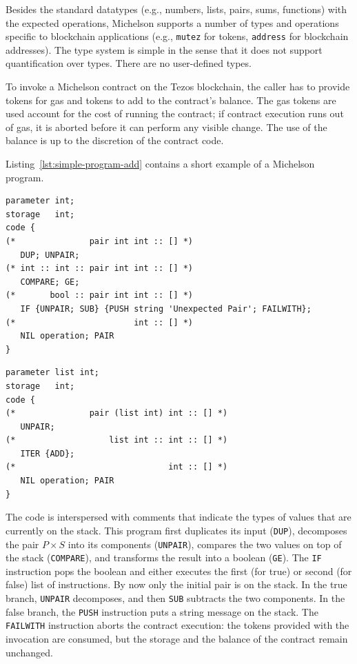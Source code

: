 \documentclass[a4paper,USenglish,cleveref, autoref,anonymous]{lipics-v2021}
\begin{document}
Besides the standard datatypes (e.g., numbers, lists, pairs, sums, functions)
with the expected operations,
Michelson supports a number of types and operations specific to blockchain applications (e.g.,
\texttt{mutez} for tokens, \texttt{address} for blockchain
addresses). The type system is simple in the sense that it does not
support quantification over types. There are no user-defined types.

To invoke a Michelson contract on the Tezos blockchain, the caller has
to provide tokens for gas and tokens to add to the contract's balance.
The gas tokens are used account for the cost of running the contract;
if contract execution runs out of gas, it is aborted before it can
perform any visible change. The use of the balance is up to the
discretion of the contract code.

Listing~\ref {lst:simple-program-add} contains a short example of a Michelson program.
\begin{lstlisting}[float=tp,captionpos=b,caption={A Michelson program},label={lst:simple-program-add}]
parameter int;
storage   int;
code { 
(*               pair int int :: [] *)
   DUP; UNPAIR;
(* int :: int :: pair int int :: [] *)
   COMPARE; GE; 
(*       bool :: pair int int :: [] *)
   IF {UNPAIR; SUB} {PUSH string 'Unexpected Pair'; FAILWITH};
(*                        int :: [] *)
   NIL operation; PAIR
}
\end{lstlisting}
\begin{lstlisting}[float=tp,captionpos=b,caption={A Michelson program
with iteration},label={lst:simple-program-iter}]
parameter list int;
storage   int;
code { 
(*               pair (list int) int :: [] *)
   UNPAIR;
(*                   list int :: int :: [] *)
   ITER {ADD};
(*                               int :: [] *)
   NIL operation; PAIR
}
\end{lstlisting}
The code is interspersed with comments that indicate the types of
values that are currently on the stack.
This program first duplicates its input (\lstinline|DUP|), decomposes
the pair $P\times S$ into its components (\lstinline|UNPAIR|),
compares the two values on top of the stack (\lstinline|COMPARE|), and
transforms the result into a boolean (\lstinline|GE|). The
\lstinline|IF| instruction pops the boolean and either executes the
first (for true) or second (for false) list of instructions. By now
only the initial pair is on the stack. In the true branch,
\lstinline|UNPAIR| decomposes, and then \lstinline|SUB| subtracts the two 
components. In the false branch, the \lstinline|PUSH| instruction puts
a string message on the stack. The \lstinline|FAILWITH| instruction
aborts the contract execution: the tokens provided with the invocation
are consumed, but the storage and the balance of the contract remain
unchanged.
\end{document}
